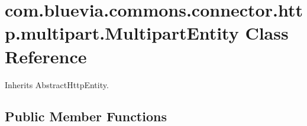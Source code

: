 \hypertarget{classcom_1_1bluevia_1_1commons_1_1connector_1_1http_1_1multipart_1_1MultipartEntity}{
\section{com.bluevia.commons.connector.http.multipart.MultipartEntity Class Reference}
\label{classcom_1_1bluevia_1_1commons_1_1connector_1_1http_1_1multipart_1_1MultipartEntity}
}


Inherits AbstractHttpEntity.

\subsection*{Public Member Functions}
